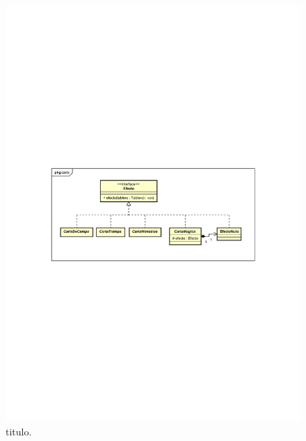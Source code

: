 \begin{figure}[H]
	\centering
	\includegraphics[scale=0.9]{includes/Implementacion_de_efectos}
	\caption{titulo.}
	\label{Implementacion_de_efectos}
\end{figure}


